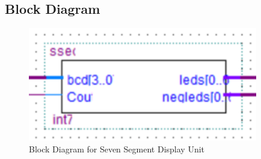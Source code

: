 \subsection{{Block Diagram}}

	\begin{figure}[H]
    		\centering
    		\includegraphics[width=10cm]{Pictures/SSEG.png}
    		\caption{{Block Diagram for Seven Segment Display Unit}}
    		\label{}
	\end{figure}


	{}

